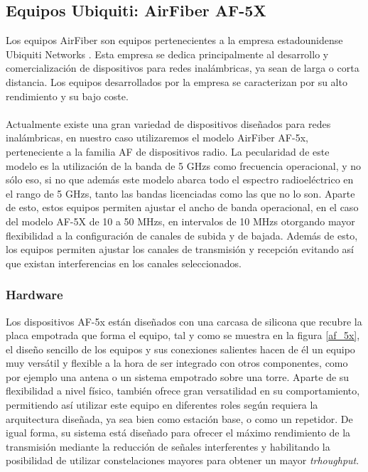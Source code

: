 \subsection{Equipos Ubiquiti: AirFiber AF-5X}
Los equipos AirFiber son equipos pertenecientes a la empresa estadounidense Ubiquiti Networks \cite{Ubiquiti}. Esta empresa se dedica principalmente al desarrollo y comercialización de dispositivos para redes inalámbricas, ya sean de larga o corta distancia. Los equipos desarrollados por la empresa se caracterizan por su alto rendimiento y su bajo coste. \\\\

Actualmente existe una gran variedad de dispositivos diseñados para redes inalámbricas, en nuestro caso utilizaremos el modelo AirFiber AF-5x, perteneciente a la familia AF de dispositivos radio. La pecularidad de este modelo es la utilización de la banda de 5 GHzs como frecuencia operacional, y no sólo eso, si no que además este modelo abarca todo el espectro radioeléctrico en el rango de 5 GHzs, tanto las bandas licenciadas como las que no lo son. Aparte de esto, estos equipos permiten ajustar el ancho de banda operacional, en el caso del modelo AF-5X de 10 a 50 MHzs, en intervalos de 10 MHzs otorgando mayor flexibilidad a la configuración de canales de subida y de bajada. Además de esto, los equipos permiten ajustar los canales de transmisión y recepción evitando así que existan interferencias en los canales seleccionados.

\subsubsection{Hardware}
Los dispositivos AF-5x están diseñados con una carcasa de silicona que recubre la placa empotrada que forma el equipo, tal y como se muestra en la figura \ref{af_5x}, el diseño sencillo de los equipos y sus conexiones salientes hacen de él un equipo muy versátil y flexible a la hora de ser integrado con otros componentes, como por ejemplo una antena o un sistema empotrado sobre una torre. Aparte de su flexibilidad a nivel físico, también ofrece gran versatilidad en su comportamiento, permitiendo así utilizar este equipo en diferentes roles según requiera la arquitectura diseñada, ya sea bien como estación base, o como un repetidor. De igual forma, su sistema está diseñado para ofrecer el máximo rendimiento de la transmisión mediante la reducción de señales interferentes y habilitando la posibilidad de utilizar constelaciones mayores para obtener un mayor \textit{trhoughput}.

